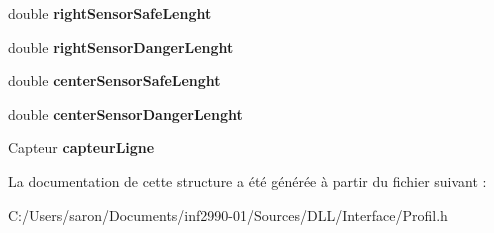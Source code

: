 \begin{DoxyCompactItemize}
\item 
\hypertarget{struct_profil_a0b283554da8102b8c1da9ee043cf951d}{double {\bfseries right\-Sensor\-Safe\-Lenght}}\label{struct_profil_a0b283554da8102b8c1da9ee043cf951d}

\item 
\hypertarget{struct_profil_a0403bdfa2c16549b194542f896d19d7e}{double {\bfseries right\-Sensor\-Danger\-Lenght}}\label{struct_profil_a0403bdfa2c16549b194542f896d19d7e}

\item 
\hypertarget{struct_profil_a010b7b884dce04f8afc44c3ace7c76b7}{double {\bfseries center\-Sensor\-Safe\-Lenght}}\label{struct_profil_a010b7b884dce04f8afc44c3ace7c76b7}

\item 
\hypertarget{struct_profil_aecb1b948ffa0cc6f31dad9bb38e972c5}{double {\bfseries center\-Sensor\-Danger\-Lenght}}\label{struct_profil_aecb1b948ffa0cc6f31dad9bb38e972c5}

\item 
\hypertarget{struct_profil_a89f5e5c0f71cc67ed66a75c8f928adf4}{Capteur {\bfseries capteur\-Ligne}}\label{struct_profil_a89f5e5c0f71cc67ed66a75c8f928adf4}

\end{DoxyCompactItemize}


La documentation de cette structure a été générée à partir du fichier suivant \-:\begin{DoxyCompactItemize}
\item 
C\-:/\-Users/saron/\-Documents/inf2990-\/01/\-Sources/\-D\-L\-L/\-Interface/Profil.\-h\end{DoxyCompactItemize}
